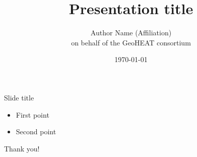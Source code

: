 \documentclass[aspectratio=169,t]{beamer}
\title{Presentation title}
\author{Author Name (Affiliation)\\[2mm]
        \footnotesize on behalf of the GeoHEAT consortium}
\date{\today}
\begin{document}
{
\begin{frame}
  \titlepage
  \geofundinglogos
\end{frame}
}

\begin{frame}{Slide title}
  \begin{itemize}
    \item First point
    \item Second point
  \end{itemize}
\end{frame}

{
\begin{frame}
  \vfill
  \begin{center}
    {Thank you!}
  \end{center}
  \vfill
  \geofundinglogos
\end{frame}
}
\end{document}
